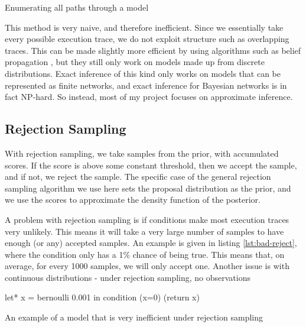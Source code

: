 \begin{listing}[ht]
	\caption{Enumerating all paths through a model}
	\label{lst:enum}
\end{listing}
	
This method is very naive, and therefore inefficient. Since we essentially take every possible execution trace, we do not exploit structure such as overlapping traces. This can be made slightly more efficient by using algorithms such as belief propagation \cite{belief-prop}, but they still only work on models made up from discrete distributions. Exact inference of this kind only works on models that can be represented as finite networks, and exact inference for Bayesian networks is in fact NP-hard\cite{cooper1990computational}. So instead, most of my project focuses on approximate inference.
	
\subsection{Rejection Sampling} \label{sec:rej}
With rejection sampling, we take samples from the prior, with accumulated scores. If the score is above some constant threshold, then we accept the sample, and if not, we reject the sample. The specific case of the general rejection sampling algorithm we use here sets the proposal distribution as the prior, and we use the scores to approximate the density function of the posterior.
	
	
A problem with rejection sampling is if conditions make most execution traces very unlikely. This means it will take a very large number of samples to have enough (or any) accepted samples. An example is given in listing \ref{lst:bad-reject}, where the condition only has a 1\% chance of being true. This means that, on average, for every 1000 samples, we will only accept one. Another issue is with continuous distributions - under rejection sampling, no observations 

\begin{listing}[!htb]
	\centering
	\begin{ocamlcode-in}
let* x = bernoulli 0.001 in
condition (x=0)
(return x)
	\end{ocamlcode-in}
	
	\caption{An example of a model that is very inefficient under rejection sampling}
	\label{lst:bad-reject}
\end{listing}
	
